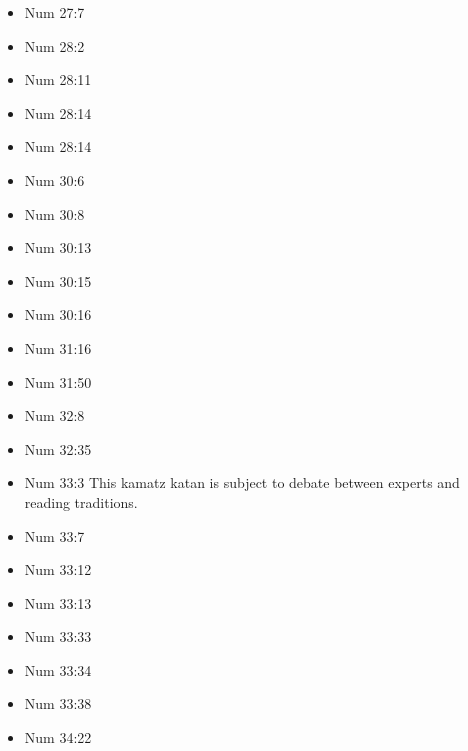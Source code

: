 \documentclass[14pt]{article}
\begin{document}
\begin{multicols}{2}
\begin{itemize}
\item Num 27:7

\item Num 28:2

\item Num 28:11

\item Num 28:14

\item Num 28:14

\item Num 30:6

\item Num 30:8

\item Num 30:13

\item Num 30:15

\item Num 30:16

\item Num 31:16

\item Num 31:50

\item Num 32:8

\item Num 32:35

\item Num 33:3 This kamatz katan is subject to debate between experts and reading traditions.

\item Num 33:7

\item Num 33:12

\item Num 33:13

\item Num 33:33

\item Num 33:34

\item Num 33:38

\item Num 34:22


\end{itemize}
\end{multicols}
\end{document}
